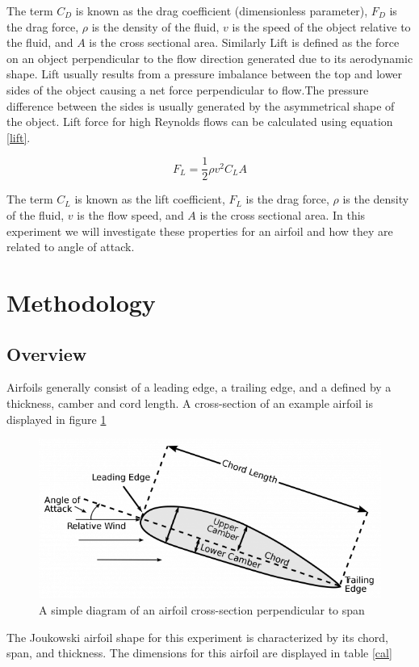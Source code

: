 \documentclass[paper=a4, fontsize=11pt, abstract=on]{scrartcl}
\numberwithin{equation}{section}		%
\numberwithin{figure}{section}			%
\numberwithin{table}{section}				%
\begin{document}
The term $C_D$ is known as the drag coefficient (dimensionless parameter), $F_D$ is the drag force, $\rho$ is the density of the fluid, $v$ is the speed of the object relative to the fluid, and $A$ is the cross sectional area. Similarly Lift is defined as the force on an object perpendicular to the flow direction generated due to its aerodynamic shape. Lift usually results from a pressure imbalance between the top and lower sides of the object causing a net force perpendicular to flow.The pressure difference between the sides is usually generated by the asymmetrical shape of the object. Lift force for high Reynolds flows can be calculated using equation \ref{lift}.

 \begin{equation}
\label{lift}
F_L= \frac{1}{2}\rho v^2C_LA
\end{equation}

The term $C_L$ is known as the lift coefficient, $F_L$ is the drag force, $\rho$ is the density of the fluid, $v$ is the flow speed, and $A$ is the cross sectional area. In this experiment we will investigate these properties for an airfoil and how they are related to angle of attack. 



\section{Methodology}

\subsection{Overview}
Airfoils generally consist of a leading edge, a trailing edge, and a defined by a thickness, camber and cord length. A cross-section of an example airfoil is displayed in figure \ref{fig1}

\begin{figure}[H]
\centering
\includegraphics[width=0.8\linewidth]{airfoil}
\caption{A simple diagram of an airfoil cross-section perpendicular to span}
\label{fig1}
\end{figure}
The Joukowski airfoil shape for this experiment is characterized by its chord, span, and thickness. The dimensions for this airfoil are displayed in table \ref{cal}
\end{document}
